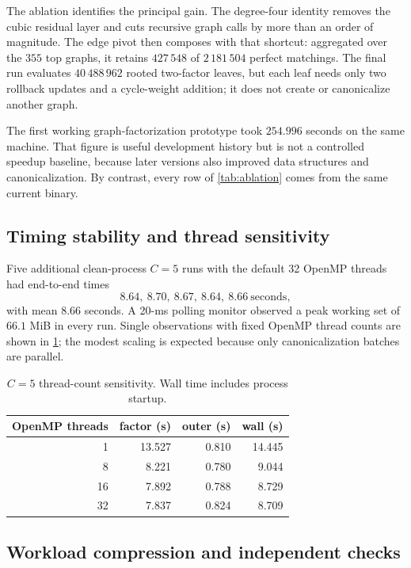 \documentclass[11pt]{article}
\theoremstyle{definition}
\theoremstyle{remark}
\begin{document}
The ablation identifies the principal gain.  The degree-four identity removes
the cubic residual layer and cuts recursive graph calls by more than an order
of magnitude.  The edge pivot then composes with that shortcut: aggregated
over the $355$ top graphs, it retains $427\,548$ of $2\,181\,504$ perfect
matchings.  The final run evaluates $40\,488\,962$ rooted two-factor leaves,
but each leaf needs only two rollback updates and a cycle-weight addition; it
does not create or canonicalize another graph.

The first working graph-factorization prototype took $254.996$ seconds on the
same machine.  That figure is useful development history but is not a
controlled speedup baseline, because later versions also improved data
structures and canonicalization.  By contrast, every row of
\cref{tab:ablation} comes from the same current binary.

\subsection{Timing stability and thread sensitivity}

Five additional clean-process $C=5$ runs with the default 32 OpenMP threads
had end-to-end times
\[
  8.64,\ 8.70,\ 8.67,\ 8.64,\ 8.66\ \text{seconds},
\]
with mean $8.66$ seconds.  A 20-ms polling monitor observed a peak working set
of $66.1$ MiB in every run.  Single observations with fixed OpenMP thread
counts are shown in \cref{tab:threads}; the modest scaling is expected because
only canonicalization batches are parallel.

\begin{table}[H]
  \centering
  \caption{$C=5$ thread-count sensitivity.  Wall time includes process startup.}
  \label{tab:threads}
  \begin{tabular}{rrrr}
    \toprule
    OpenMP threads & factor (s) & outer (s) & wall (s) \\
    \midrule
    1  & 13.527 & 0.810 & 14.445 \\
    8  &  8.221 & 0.780 &  9.044 \\
    16 &  7.892 & 0.788 &  8.729 \\
    32 &  7.837 & 0.824 &  8.709 \\
    \bottomrule
  \end{tabular}
\end{table}

\subsection{Workload compression and independent checks}
\end{document}
